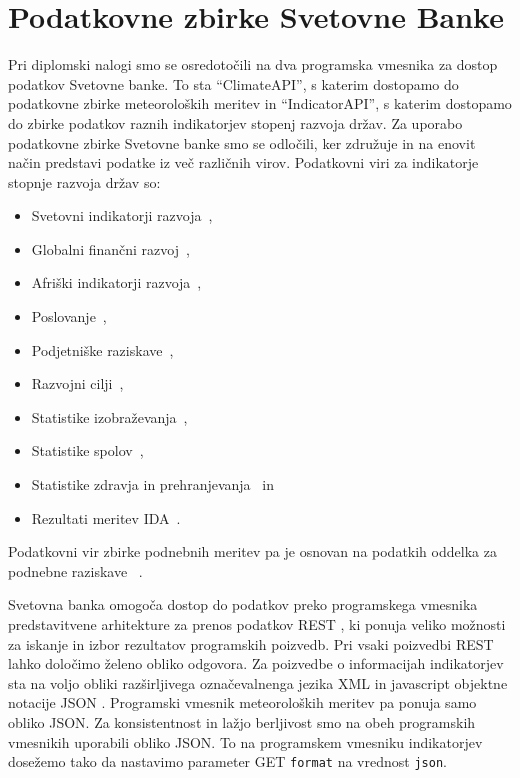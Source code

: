 \chapter{Podatkovne zbirke Svetovne Banke}

Pri diplomski nalogi smo se osredotočili na dva programska vmesnika za dostop 
podatkov Svetovne banke. To sta ``ClimateAPI'', s katerim dostopamo do 
podatkovne zbirke meteoroloških meritev in ``IndicatorAPI'', s katerim dostopamo do 
zbirke podatkov raznih indikatorjev stopenj razvoja držav.
Za uporabo podatkovne zbirke Svetovne banke smo se odločili, ker združuje in na
enovit način predstavi podatke iz več različnih virov. Podatkovni viri za 
indikatorje stopnje razvoja držav so:
\begin{itemize}  
  \item Svetovni indikatorji razvoja~\cite{world_dev_ind}, %
  \item Globalni finančni razvoj~\cite{glob_fin_dev},
  \item Afriški indikatorji razvoja~\cite{africa_dev_ind},
  \item Poslovanje~\cite{doing_buseness},
  \item Podjetniške raziskave~\cite{ent_surveys}, 
  \item Razvojni cilji~\cite{mil_dev_goals}, 
  \item Statistike izobraževanja~\cite{edu_stat}, 
  \item Statistike spolov~\cite{gen_stat},
  \item Statistike zdravja in prehranjevanja~\cite{health_pop_stat} in
  \item Rezultati meritev IDA~\cite{ida_res_mes_sys}.
\end{itemize}  

Podatkovni vir zbirke podnebnih meritev pa je osnovan na podatkih oddelka
za podnebne raziskave ~\cite{climate_data}.

Svetovna banka omogoča dostop do podatkov preko programskega vmesnika 
predstavitvene arhitekture za prenos podatkov REST 
, ki
ponuja veliko možnosti za iskanje in izbor rezultatov programskih poizvedb. Pri vsaki 
poizvedbi REST lahko določimo želeno obliko odgovora. Za poizvedbe o 
informacijah indikatorjev sta na voljo obliki 
razširljivega označevalnenga jezika XML  
in javascript objektne notacije JSON . Programski vmesnik 
meteoroloških meritev pa ponuja samo obliko JSON. Za konsistentnost in lažjo
berljivost smo na obeh programskih vmesnikih uporabili obliko JSON. To na
programskem vmesniku indikatorjev dosežemo tako da nastavimo parameter GET
\verb|format| na vrednost \verb|json|. 


